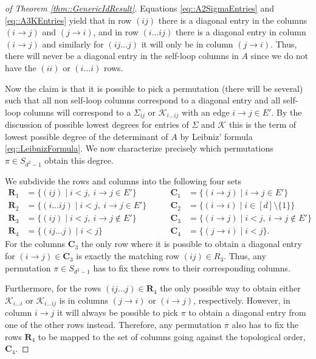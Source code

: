 \documentclass{biometrika}
\begin{document}
\begin{proof}[of Theorem \ref{thm::GenericIdResult}]
  Equations \eqref{eq::A2SigmaEntries} and \eqref{eq::A3KEntries} yield that in row $(ij)$  there is a diagonal entry in the columns $(i \rightarrow j)$ and $(j \rightarrow i)$, and in row $(i \dots ij)$ there is a diagonal entry in column $(i \rightarrow j)$ and similarly for $(ij \dots j)$ it will only be in column $(j \rightarrow i)$. Thus, there will never be a diagonal entry in the self-loop columns in $A$ since we do not have the $(ii)$ or $(i \dots i)$ rows. 

    Now the claim is that it is possible to pick a permutation (there will be several) such that all non self-loop columns correspond to a diagonal entry and all self-loop columns will correspond to a $\Sigma_{ij}$ or $\mathcal{K} _{i \dots ij}$ with an edge $i \rightarrow j \in E'$. By the discussion of possible lowest degrees for entries of $\Sigma$ and $\mathcal{K} $ this is the term of lowest possible degree of the determinant of $A$ by Leibniz' formula \eqref{eq::LeibnizFormula}. 
     We now characterize precisely which permutations $\pi \in S_{d^2-1}$ obtain this degree. 

    We subdivide the rows and columns into the following four sets
    \begin{align*}
        \mathbf{R}_1 &=  \{ (ij) \; | \; i < j,\   i \rightarrow j \in E' \} \qquad   &\mathbf{C}_1 &= \{ (i \rightarrow j) \; | \; i \rightarrow j \in E' \} \\
        \mathbf{R}_2 &=  \{ (i \dots ij) \; | \; i < j,  \ i \rightarrow j \in E' \} \qquad &\mathbf{C}_2 &= \{(i \rightarrow i) \; | \; i \in [d] \setminus \{1 \} \}  \\ 
        \mathbf{R}_3 &=  \{ (ij) \; | \; i < j, \  i \rightarrow j \not \in E' \} \qquad  &\mathbf{C}_3 &= \{ (i \rightarrow j) \; | \; i < j, \ i \rightarrow j \not \in E' \}\\
        \mathbf{R}_4 &=  \{ (ij \dots j) \; | \; i < j \} \qquad  &\mathbf{C}_4 &= \{ (j \rightarrow i) \; | \; i < j \} .
    \end{align*}
    For the columns $\mathbf{C}_3$ the only row where it is possible to obtain a diagonal entry for $(i \rightarrow j) \in \mathbf{C}_3$ is exactly the matching row $ (ij) \in R_3$. Thus, any permutation $\pi \in S_{d^2-1}$ has to fix these rows to their corresponding columns. 

    Furthermore, for the rows $ (ij \dots j) \in \mathbf{R}_4$ the only possible way to obtain either $\mathcal{K} _{i \dots i}$ or $\mathcal{K} _{i \dots ij}$  is in columns $(j \rightarrow i)$ or $(i \rightarrow j)$, respectively. However, in column $i \rightarrow j$ it will always be possible to pick $\pi$ to obtain a diagonal entry from one of the other rows instead. Therefore, any permutation $\pi$ also has to fix the rows $\mathbf{R}_4$ to be mapped to the set of columns going against the topological order, $\mathbf{C}_4$. 


\end{proof}
\end{document}
